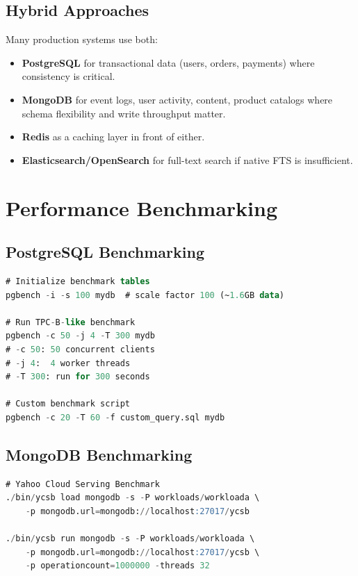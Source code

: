 \documentclass[12pt,a4paper]{article}
\begin{document}
\subsection{Hybrid Approaches}

Many production systems use both:
\begin{itemize}
    \item \textbf{PostgreSQL} for transactional data (users, orders, payments) where consistency is critical.
    \item \textbf{MongoDB} for event logs, user activity, content, product catalogs where schema flexibility and write throughput matter.
    \item \textbf{Redis} as a caching layer in front of either.
    \item \textbf{Elasticsearch/OpenSearch} for full-text search if native FTS is insufficient.
\end{itemize}


\section{Performance Benchmarking}

\subsection{PostgreSQL Benchmarking}

\begin{lstlisting}[language=SQL, caption={pgbench for PostgreSQL benchmarking}]
# Initialize benchmark tables
pgbench -i -s 100 mydb  # scale factor 100 (~1.6GB data)

# Run TPC-B-like benchmark
pgbench -c 50 -j 4 -T 300 mydb
# -c 50: 50 concurrent clients
# -j 4:  4 worker threads
# -T 300: run for 300 seconds

# Custom benchmark script
pgbench -c 20 -T 60 -f custom_query.sql mydb
\end{lstlisting}

\subsection{MongoDB Benchmarking}

\begin{lstlisting}[language=SQL, caption={YCSB for MongoDB benchmarking}]
# Yahoo Cloud Serving Benchmark
./bin/ycsb load mongodb -s -P workloads/workloada \
    -p mongodb.url=mongodb://localhost:27017/ycsb

./bin/ycsb run mongodb -s -P workloads/workloada \
    -p mongodb.url=mongodb://localhost:27017/ycsb \
    -p operationcount=1000000 -threads 32
\end{lstlisting}
\end{document}
